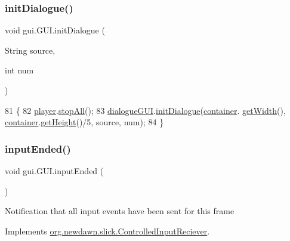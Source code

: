 \subsubsection{\texorpdfstring{init\+Dialogue()}{initDialogue()}}
{\footnotesize\ttfamily void gui.\+G\+U\+I.\+init\+Dialogue (\begin{DoxyParamCaption}\item[{String}]{source,  }\item[{int}]{num }\end{DoxyParamCaption})\hspace{0.3cm}{\ttfamily [inline]}}


\begin{DoxyCode}
81                                                       \{
82         \mbox{\hyperlink{classgui_1_1_g_u_i_a96b66f816e243b9bae9754fba26f5cd2}{player}}.\mbox{\hyperlink{classentities_1_1_player_adc49b9d4f92d988724264ff27f2225d8}{stopAll}}();
83         \mbox{\hyperlink{classgui_1_1_g_u_i_ae48d5f580a490dd73bc59e64937cc46f}{dialogueGUI}}.\mbox{\hyperlink{classgui_1_1_dialogue_g_u_i_a3badcdab9688173faa3d1087eb6e735e}{initDialogue}}(\mbox{\hyperlink{classgui_1_1_g_u_i_acaa3c69a02ef67d6ebd11fcbcc87049d}{container}}.
      \mbox{\hyperlink{classorg_1_1newdawn_1_1slick_1_1_game_container_a938fe1a28567182445e60450915d5f69}{getWidth}}(), \mbox{\hyperlink{classgui_1_1_g_u_i_acaa3c69a02ef67d6ebd11fcbcc87049d}{container}}.\mbox{\hyperlink{classorg_1_1newdawn_1_1slick_1_1_game_container_a7eff88473fe5715fdfc2f92e8cb48521}{getHeight}}()/5, source, num);
84     \}
\end{DoxyCode}
\mbox{\label{classgui_1_1_g_u_i_a7e5dde1e8fb225259f134f132ff9f4fb}} 
\subsubsection{\texorpdfstring{input\+Ended()}{inputEnded()}}
{\footnotesize\ttfamily void gui.\+G\+U\+I.\+input\+Ended (\begin{DoxyParamCaption}{ }\end{DoxyParamCaption})\hspace{0.3cm}{\ttfamily [inline]}}

Notification that all input events have been sent for this frame 

Implements \mbox{\hyperlink{interfaceorg_1_1newdawn_1_1slick_1_1_controlled_input_reciever_a61c6cde7cbf28a6969cafe3ec4f1c121}{org.\+newdawn.\+slick.\+Controlled\+Input\+Reciever}}.


